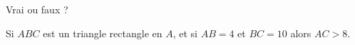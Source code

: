 
\begin{mental}
    
Vrai ou faux ?

Si \( ABC\) est un triangle rectangle en \( A\), et si \( AB=4\) et \( BC=10\) alors \( AC>8\).

\begin{center}

\end{center}

\end{mental}

